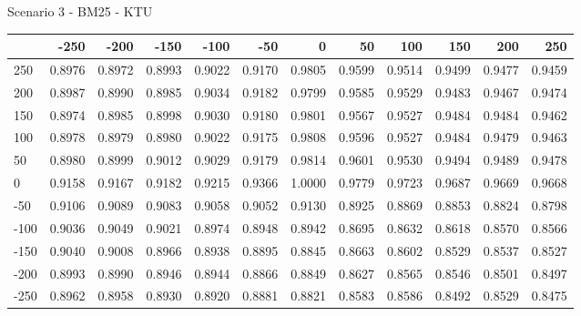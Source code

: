 Scenario 3 - BM25 - KTU
\begin{tabular}{lrrrrrrrrrrr}
\toprule
{} &   -250 &   -200 &   -150 &   -100 &   -50  &    0   &    50  &    100 &    150 &    200 &    250 \\
\midrule
 250 & 0.8976 & 0.8972 & 0.8993 & 0.9022 & 0.9170 & 0.9805 & 0.9599 & 0.9514 & 0.9499 & 0.9477 & 0.9459 \\
 200 & 0.8987 & 0.8990 & 0.8985 & 0.9034 & 0.9182 & 0.9799 & 0.9585 & 0.9529 & 0.9483 & 0.9467 & 0.9474 \\
 150 & 0.8974 & 0.8985 & 0.8998 & 0.9030 & 0.9180 & 0.9801 & 0.9567 & 0.9527 & 0.9484 & 0.9484 & 0.9462 \\
 100 & 0.8978 & 0.8979 & 0.8980 & 0.9022 & 0.9175 & 0.9808 & 0.9596 & 0.9527 & 0.9484 & 0.9479 & 0.9463 \\
 50  & 0.8980 & 0.8999 & 0.9012 & 0.9029 & 0.9179 & 0.9814 & 0.9601 & 0.9530 & 0.9494 & 0.9489 & 0.9478 \\
 0   & 0.9158 & 0.9167 & 0.9182 & 0.9215 & 0.9366 & 1.0000 & 0.9779 & 0.9723 & 0.9687 & 0.9669 & 0.9668 \\
-50  & 0.9106 & 0.9089 & 0.9083 & 0.9058 & 0.9052 & 0.9130 & 0.8925 & 0.8869 & 0.8853 & 0.8824 & 0.8798 \\
-100 & 0.9036 & 0.9049 & 0.9021 & 0.8974 & 0.8948 & 0.8942 & 0.8695 & 0.8632 & 0.8618 & 0.8570 & 0.8566 \\
-150 & 0.9040 & 0.9008 & 0.8966 & 0.8938 & 0.8895 & 0.8845 & 0.8663 & 0.8602 & 0.8529 & 0.8537 & 0.8527 \\
-200 & 0.8993 & 0.8990 & 0.8946 & 0.8944 & 0.8866 & 0.8849 & 0.8627 & 0.8565 & 0.8546 & 0.8501 & 0.8497 \\
-250 & 0.8962 & 0.8958 & 0.8930 & 0.8920 & 0.8881 & 0.8821 & 0.8583 & 0.8586 & 0.8492 & 0.8529 & 0.8475 \\
\bottomrule
\end{tabular}

